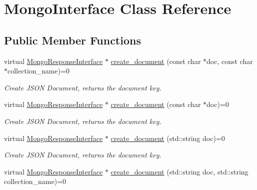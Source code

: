 \hypertarget{classMongoInterface}{}\section{Mongo\+Interface Class Reference}
\label{classMongoInterface}
\subsection*{Public Member Functions}
\begin{DoxyCompactItemize}
\item 
virtual \hyperlink{classMongoResponseInterface}{Mongo\+Response\+Interface} $\ast$ \hyperlink{classMongoInterface_a40a5973d65dd15c46df9f6c06fbb464a}{create\+\_\+document} (const char $\ast$doc, const char $\ast$collection\+\_\+name)=0\hypertarget{classMongoInterface_a40a5973d65dd15c46df9f6c06fbb464a}{}\label{classMongoInterface_a40a5973d65dd15c46df9f6c06fbb464a}

\begin{DoxyCompactList}\small\item\em Create J\+S\+ON Document, returns the document key. \end{DoxyCompactList}\item 
virtual \hyperlink{classMongoResponseInterface}{Mongo\+Response\+Interface} $\ast$ \hyperlink{classMongoInterface_af621e8af8a4205e1cf06d1964ba36843}{create\+\_\+document} (const char $\ast$doc)=0\hypertarget{classMongoInterface_af621e8af8a4205e1cf06d1964ba36843}{}\label{classMongoInterface_af621e8af8a4205e1cf06d1964ba36843}

\begin{DoxyCompactList}\small\item\em Create J\+S\+ON Document, returns the document key. \end{DoxyCompactList}\item 
virtual \hyperlink{classMongoResponseInterface}{Mongo\+Response\+Interface} $\ast$ \hyperlink{classMongoInterface_aaa549157c25eef7e9ed21b143c28bb64}{create\+\_\+document} (std\+::string doc)=0\hypertarget{classMongoInterface_aaa549157c25eef7e9ed21b143c28bb64}{}\label{classMongoInterface_aaa549157c25eef7e9ed21b143c28bb64}

\begin{DoxyCompactList}\small\item\em Create J\+S\+ON Document, returns the document key. \end{DoxyCompactList}\item 
virtual \hyperlink{classMongoResponseInterface}{Mongo\+Response\+Interface} $\ast$ \hyperlink{classMongoInterface_a5870d9a0cb64044d195893cc4d59801f}{create\+\_\+document} (std\+::string doc, std\+::string collection\+\_\+name)=0\hypertarget{classMongoInterface_a5870d9a0cb64044d195893cc4d59801f}{}\label{classMongoInterface_a5870d9a0cb64044d195893cc4d59801f}


\end{DoxyCompactItemize}
